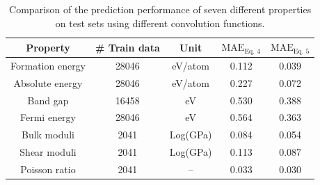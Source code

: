 \documentclass[twocolumn, prl]{revtex4-1}
\begin{document}
\begin{table}[htb]%
\caption{Comparison of the prediction performance of seven different properties on test sets using different convolution functions.}
\begin{ruledtabular}
\begin{tabular}{ccccc}
  Property    & \# Train data		&	Unit   & $\textrm{MAE}_{\textrm{Eq.~4}}$   & $\textrm{MAE}_{\textrm{Eq.~5}}$ \\
  \hline
  Formation energy & 28046    		&  eV/atom  & 0.112 					&	0.039\\
  Absolute energy	& 28046			&  eV/atom	& 0.227					&	0.072\\
  Band gap			& 16458			&  eV		& 0.530					&	0.388\\
  Fermi energy		& 28046			&  eV		& 0.564					&	0.363\\
  Bulk moduli		& 2041 			&  Log(GPa)	& 0.084					&	0.054\\
  Shear moduli		& 2041			&  Log(GPa) & 0.113					&	0.087\\
  Poisson ratio		& 2041			& --			& 0.033					&	0.030\\

\end{tabular}
\end{ruledtabular}
\label{tab:general-param}
\end{table}
\end{document}
